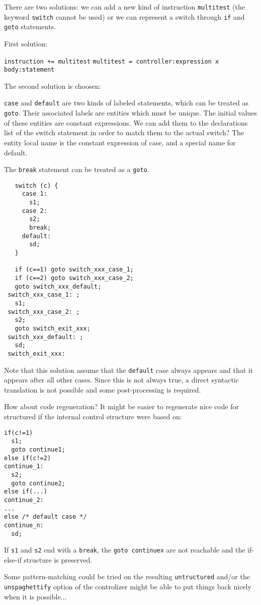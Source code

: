 \documentclass[a4paper]{report}
\begin{document}
There are two solutions: we can add a new kind of instruction
\verb/multitest/ (the keyword \verb/switch/ cannot be used) or we can
represent a switch through \verb/if/ and \verb/goto/ statements.  

First solution: 

\verb/instruction += multitest/
\verb/multitest = controller:expression x body:statement/

The second solution is choosen: 
 
\verb/case/ and \verb/default/ are two kinds of labeled statements, which
can be treated as \verb/goto/. Their
associated labels are entities which must be unique.  The initial values of these
entities are constant expressions. We can add them to the
declarations list of the switch statement in order to match them to the actual
switch? The entity local name is the constant expression of case, and a
special name for default.  

The \verb/break/ statement can be treated as a \verb/goto/.

\begin{lstlisting}
   switch (c) {
     case 1:
       s1;
     case 2: 
       s2;  
       break;
     default: 
       sd;
   }

   if (c==1) goto switch_xxx_case_1;
   if (c==2) goto switch_xxx_case_2;
   goto switch_xxx_default;
 switch_xxx_case_1: ;
   s1;
 switch_xxx_case_2: ;
   s2;
   goto switch_exit_xxx;
 switch_xxx_default: ;
   sd;      
 switch_exit_xxx:
\end{lstlisting}

Note that this solution assume that the \verb/default/ case always
appears and that it appears after all other cases. Since this is not
always true, a direct syntactic translation is not possible and some
post-processing is required.

How about code regeneration? It might be easier to regenerate nice
code for structured if the internal control structure were based on:

\begin{lstlisting}
if(c!=1) 
  s1;
  goto continue1;
else if(c!=2)
continue_1:
  s2;
  goto continue2;
else if(...)
continue_2:
...
else /* default case */
continue_n:
  sd;
\end{lstlisting}

If \verb/s1/ and \verb/s2/ end with a \verb/break/, the
\verb/goto continuex/ are not reachable and the if-else-if structure
is preserved.

Some pattern-matching could be tried on the resulting
\verb/untructured/ and/or the \verb/unspaghettify/ option of the
controlizer might be able to put things back nicely when it is
possible...
\end{document}
